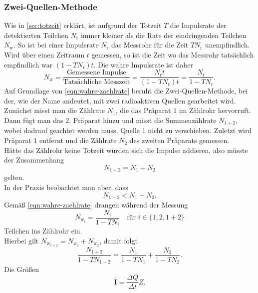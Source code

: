 \subsubsection{Zwei-Quellen-Methode}
\label{sec:theo:zwei-quellen}
Wie in \autoref{sec:totzeit} erklärt, ist aufgrund der Totzeit $T$ die Impulsrate der detektierten Teilchen $N_\text{r}$
immer kleiner als die Rate der eindringenden Teilchen $N_\text{w}$. So ist bei einer Impulsrate $N_\text{r}$ das 
Messrohr für die Zeit $TN_\text{r}$ unempfindlich. Wird über einen Zeitraum $t$ gemessen, so ist die Zeit wo
das Messrohr tatsächlich empfindlich war $(1-TN_\text{r})t$. Die wahre Impulsrate ist daher
\begin{equation}
	N_\text{w} = \frac{\text{Gemessene Impulse}}{\text{Tatsächliche Messzeit}}
	= \frac{N_\text{r} t}{(1-TN_\text{r}) t} = \frac{N_\text{r}}{1 - TN_\text{r}}.
	\label{eqn:wahre-zaehlrate}
\end{equation}
\noindent
Auf Grundlage von \autoref{eqn:wahre-zaehlrate} beruht die Zwei-Quellen-Methode, bei der, wie der Name andeutet, mit
zwei radioaktiven Quellen gearbeitet wird.
Zunächst misst man die Zählrate $N_1$, die das Präparat 1 im Zählrohr hervorruft. Dann fügt man das 2. Präparat hinzu
und misst die Summenzählrate $N_{1+2}$, wobei dadrauf geachtet werden muss, Quelle 1 nicht zu verschieben. Zuletzt
wird Präparat 1 entfernt und die Zählrate $N_2$ des zweiten Präparats gemessen.
\\
Hätte das Zählrohr keine Totzeit würden sich die Impulse addieren, also müsste der Zusammenhang
\begin{equation}
	N_{1+2} = N_1 + N_2
\end{equation}
gelten. \\
In der Praxis beobachtet man aber, dass
\begin{equation}
	N_{1+2} < N_1 + N_2.
\end{equation}
Gemäß \autoref{eqn:wahre-zaehlrate} drangen während der Messung
\begin{equation}
	N_{{\text{w}_i}} = \frac{N_i}{1 - TN_i} 
		\quad \text{für } i \in \{1, 2, 1+2\}
\end{equation}
Teilchen ins Zählrohr ein.
\\
Hierbei gilt $N_{\text{w}_{1+2}} = N_{\text{w}_{1}} + N_{\text{w}_{2}}$, damit folgt
\begin{equation}
	\frac{N_{1+2}}{1 - TN_{1+2}} =
	\frac{N_1}{1 - TN_1} +
	\frac{N_2}{1 - TN_2} .
	\label{eqn:theo:paar-brueche}
\end{equation}
\noindent
Die Größen 
\begin{equation}
	\overline{\mathbf{I}} = \frac{\Delta Q}{\Delta t} Z.
\end{equation}


